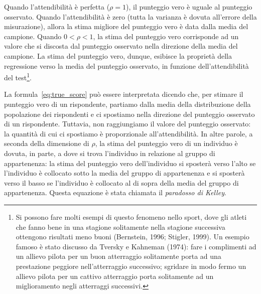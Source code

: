 Quando l'attendibilità è perfetta ($\rho = 1$), il punteggio vero è uguale al punteggio osservato.  Quando l'attendibilità è zero (tutta la varianza è dovuta all'errore della misurazione), allora la stima migliore del punteggio vero è data dalla media del campione. Quando $0 < \rho < 1 $, la stima del punteggio vero corrisponde ad un valore che si discosta dal punteggio osservato nella direzione della media del campione. La stima del punteggio vero, dunque, esibisce la proprietà della regressione verso la media del punteggio osservato, in funzione dell'attendibilità del test\footnote{Si possono fare molti esempi di questo fenomeno nello sport, dove gli atleti che fanno  bene in una stagione solitamente nella stagione successiva ottengono risultati meno buoni (Bernstein, 1996; Stigler, 1999). Un esempio famoso è stato discusso da Tversky e Kahneman (1974): fare i complimenti ad un allievo pilota per un buon  atterraggio solitamente porta ad una prestazione peggiore nell’atterraggio successivo; sgridare  in modo fermo un allievo pilota per un cattivo atterraggio porta solitamente ad un miglioramento negli atterraggi successivi.}.

La formula~\ref{eq:true_score} può essere interpretata dicendo che, per stimare il punteggio vero di un rispondente, partiamo dalla media della distribuzione della  popolazione dei rispondenti e ci spostiamo nella direzione del punteggio osservato di un rispondente. Tuttavia, non raggiungiamo il valore del punteggio osservato: la quantità di cui ci spostiamo è proporzionale all'attendibilità.
In altre parole, a seconda della dimensione di $\rho$, la stima del punteggio vero di un individuo è dovuta, in parte, a dove si trova l'individuo in relazione al gruppo di appartenenza: la stima del punteggio vero dell'individuo si sposterà verso l'alto se l'individuo è collocato sotto la media del gruppo di appartenenza e si sposterà verso il basso se l'individuo è collocato al di sopra della media del gruppo di appartenenza.
Questa equazione è stata chiamata il \emph{paradosso di Kelley}.

